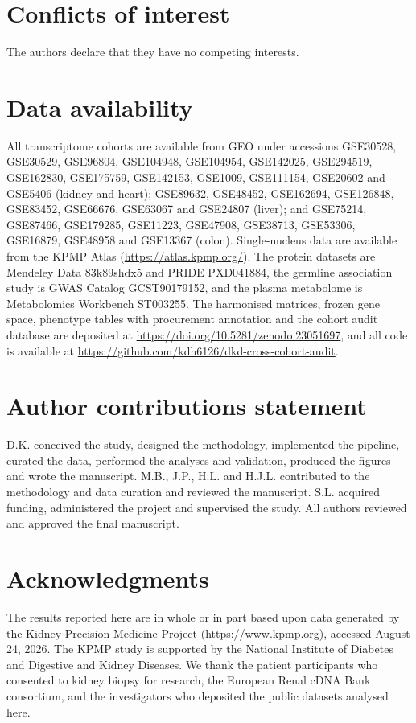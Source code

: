 \documentclass[unnumsec,webpdf,contemporary,large,numbered]{oup-authoring-template}
\begin{document}
\section{Conflicts of interest}

The authors declare that they have no competing interests.

\section{Data availability}

All transcriptome cohorts are available from GEO under accessions GSE30528, GSE30529, GSE96804,
GSE104948, GSE104954, GSE142025, GSE294519, GSE162830, GSE175759, GSE142153, GSE1009, GSE111154,
GSE20602 and GSE5406 (kidney and heart); GSE89632, GSE48452, GSE162694, GSE126848, GSE83452,
GSE66676, GSE63067 and GSE24807 (liver); and GSE75214, GSE87466, GSE179285, GSE11223, GSE47908,
GSE38713, GSE53306, GSE16879, GSE48958 and GSE13367 (colon). Single-nucleus data are available from
the KPMP Atlas (\url{https://atlas.kpmp.org/}). The protein datasets are Mendeley Data 83k89shdx5
and PRIDE PXD041884, the germline association study is GWAS Catalog GCST90179152, and the plasma
metabolome is Metabolomics Workbench ST003255. The harmonised matrices, frozen gene space,
phenotype tables with procurement annotation and the cohort audit database are deposited at
\url{https://doi.org/10.5281/zenodo.23051697}, and all code is available at
\url{https://github.com/kdh6126/dkd-cross-cohort-audit}.

\section{Author contributions statement}

D.K. conceived the study, designed the methodology, implemented the pipeline, curated the data,
performed the analyses and validation, produced the figures and wrote the manuscript. M.B., J.P.,
H.L. and H.J.L. contributed to the methodology and data curation and reviewed the manuscript.
S.L. acquired funding, administered the project and supervised the study. All authors reviewed
and approved the final manuscript.

\section{Acknowledgments}

The results reported here are in whole or in part based upon data generated by the Kidney
Precision Medicine Project (\url{https://www.kpmp.org}), accessed August 24, 2026. The KPMP study is
supported by the National Institute of Diabetes and Digestive and Kidney Diseases. We thank the
patient participants who consented to kidney biopsy for research, the European Renal cDNA Bank
consortium, and the investigators who deposited the public datasets analysed here.
\end{document}
